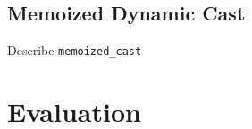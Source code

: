 \documentclass[preprint]{sigplanconf}
\makeatletter
\DeclareRobustCommand{\code}[1]{{\lstinline[breaklines=false,escapechar=@]{#1}}}
\makeatother
\begin{document}



\subsection{Memoized Dynamic Cast}
\label{sec:memcast}

Describe \code{memoized_cast}

\section{Evaluation} %
\label{sec:eval}
\end{document}
